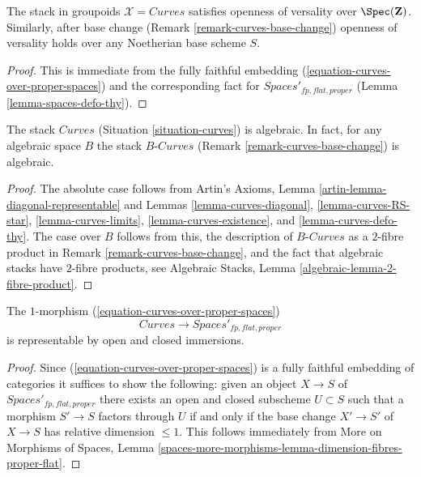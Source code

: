 \begin{lemma}
\label{lemma-curves-defo-thy}
The stack in groupoids $\mathcal{X} = \textit{Curves}$
satisfies openness of versality over $\Spec(\mathbf{Z})$.
Similarly, after base change (Remark \ref{remark-curves-base-change})
openness of versality holds over any Noetherian base scheme $S$.
\end{lemma}

\begin{proof}
This is immediate from the fully faithful embedding
(\ref{equation-curves-over-proper-spaces}) and
the corresponding fact for $\textit{Spaces}'_{fp, flat, proper}$
(Lemma \ref{lemma-spaces-defo-thy}).
\end{proof}

\begin{theorem}
\label{theorem-curves-algebraic}
The stack $\textit{Curves}$ (Situation \ref{situation-curves})
is algebraic. In fact, for any algebraic space $B$ the stack
$B\textit{-Curves}$ (Remark \ref{remark-curves-base-change})
is algebraic.
\end{theorem}

\begin{proof}
The absolute case follows from
Artin's Axioms, Lemma \ref{artin-lemma-diagonal-representable}
and Lemmas \ref{lemma-curves-diagonal},
\ref{lemma-curves-RS-star},
\ref{lemma-curves-limits},
\ref{lemma-curves-existence}, and
\ref{lemma-curves-defo-thy}.
The case over $B$ follows from this, the description of
$B\textit{-Curves}$ as a $2$-fibre product in
Remark \ref{remark-curves-base-change}, and the fact
that algebraic stacks have $2$-fibre products, see
Algebraic Stacks, Lemma \ref{algebraic-lemma-2-fibre-product}.
\end{proof}

\begin{lemma}
\label{lemma-curves-open-and-closed-in-spaces}
The $1$-morphism (\ref{equation-curves-over-proper-spaces})
$$
\textit{Curves} \longrightarrow \textit{Spaces}'_{fp, flat, proper}
$$
is representable by open and closed immersions.
\end{lemma}

\begin{proof}
Since (\ref{equation-curves-over-proper-spaces}) is a fully faithful
embedding of categories it suffices to show the following:
given an object $X \to S$ of $\textit{Spaces}'_{fp, flat, proper}$
there exists an open and closed subscheme $U \subset S$
such that a morphism $S' \to S$ factors through $U$ if and only if the
base change $X' \to S'$ of $X \to S$ has relative dimension $\leq 1$.
This follows immediately from
More on Morphisms of Spaces, Lemma
\ref{spaces-more-morphisms-lemma-dimension-fibres-proper-flat}.
\end{proof}

